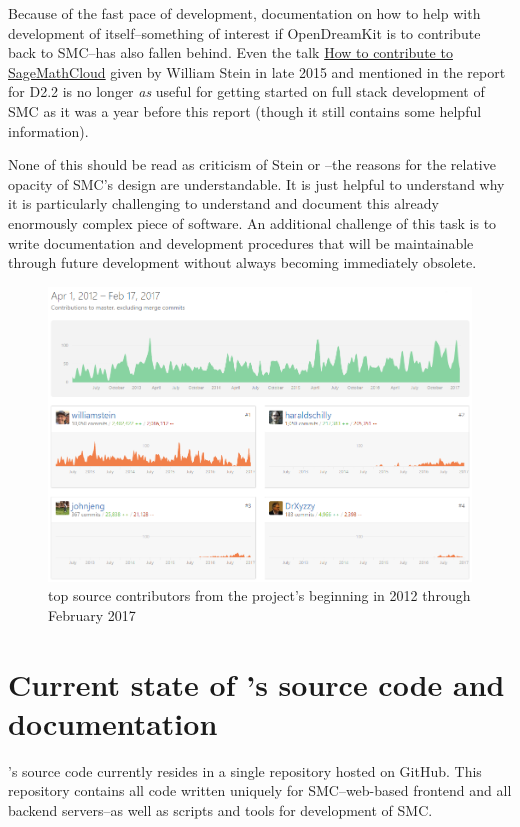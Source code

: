 \documentclass{deliverablereport}
\begin{document}
Because of the fast pace of development, documentation on how to help with
development of \SMC itself--something of interest if OpenDreamKit is to
contribute back to SMC--has also fallen behind.  Even the talk
\href{https://youtu.be/GOuy07Kift4}{How to contribute to SageMathCloud} given
by William Stein in late 2015 and mentioned in the report for D2.2
is no longer \emph{as} useful for getting started on full stack development
of SMC as it was a year before this report (though it still contains some
helpful information).

None of this should be read as criticism of Stein or \SMC--the reasons for the
relative opacity of SMC's design are understandable.  It is just helpful to
understand why it is particularly challenging to understand and document this
already enormously complex piece of software.  An additional challenge of this
task is to write documentation and development procedures that will be
maintainable through future development without always becoming immediately
obsolete.

\begin{figure}
\includegraphics[width=\textwidth]{images/smc-contributions-2017-02-17.png}
\caption{top \SMC source contributors from the project's beginning in 2012 through February 2017}
\end{figure}

\section{Current state of \SMC's source code and documentation}

\SMC's source code currently resides in a single  repository
hosted on GitHub.  This repository contains all code written uniquely for
SMC--web-based frontend and all backend servers--as well as scripts and tools
for development of SMC.
\end{document}
